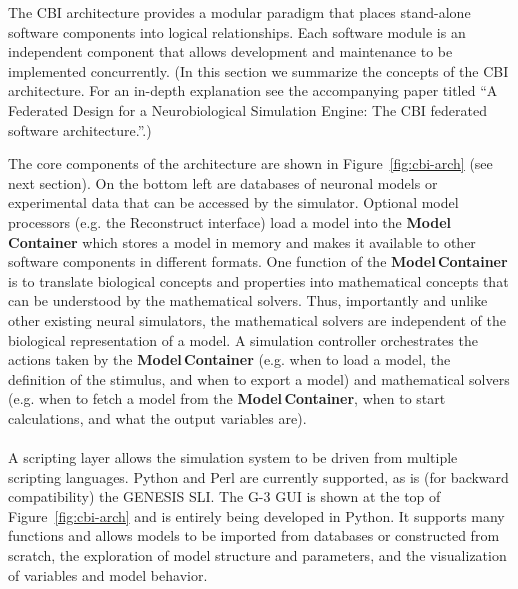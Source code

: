 \documentclass[10pt]{article}
\begin{document}
The CBI architecture provides a modular paradigm that places stand-alone
software components into logical relationships.  Each software module
is an independent component that allows development and
maintenance to be implemented concurrently.
(In this section we summarize the concepts of the CBI architecture.
For an in-depth explanation see the accompanying paper titled ``A
Federated Design for a Neurobiological Simulation Engine: The CBI
federated software architecture.''.)

The core components of the architecture are shown in
Figure~\ref{fig:cbi-arch} (see next section). On the bottom left are
databases of neuronal models or experimental data that can be accessed
by the simulator. Optional model processors (e.g. the Reconstruct
interface) load a model into the {\bf Model\,Container} which stores a
model in memory and makes it available to other software components in
different formats.  One function of the {\bf Model\,Container} is to
translate biological concepts and properties into mathematical
concepts that can be understood by the mathematical solvers. Thus,
importantly and unlike other existing neural simulators, the
mathematical solvers are independent of the biological representation
of a model. A simulation controller orchestrates the actions taken by
the {\bf Model\,Container} (e.g. when to load a model, the definition
of the stimulus, and when to export a model) and mathematical solvers
(e.g. when to fetch a model from the {\bf Model\,Container}, when to
start
calculations, and what the output variables are).\\

 \\

A scripting layer allows the simulation system to be driven from
multiple scripting languages. Python and Perl are currently supported,
as is (for backward compatibility) the GENESIS SLI. The G-3 GUI is shown at the top of
Figure~\ref{fig:cbi-arch} and is entirely being developed in Python.  It supports many functions and
allows models to be imported from databases or constructed from
scratch, the exploration of model structure and parameters, and the
visualization of variables and model behavior.
\end{document}
